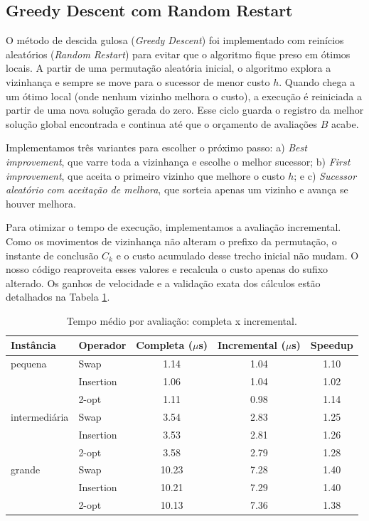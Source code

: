 \subsection{Greedy Descent com Random Restart}
\label{subsec:busca-local}

O método de descida gulosa (\textit{Greedy Descent}) foi implementado com reinícios aleatórios (\textit{Random Restart}) para evitar que o algoritmo fique preso em ótimos locais. A partir de uma permutação aleatória inicial, o algoritmo explora a vizinhança e sempre se move para o sucessor de menor custo $h$. Quando chega a um ótimo local (onde nenhum vizinho melhora o custo), a execução é reiniciada a partir de uma nova solução gerada do zero. Esse ciclo guarda o registro da melhor solução global encontrada e continua até que o orçamento de avaliações $B$ acabe.

Implementamos três variantes para escolher o próximo passo: a) \textit{Best improvement}, que varre toda a vizinhança e escolhe o melhor sucessor; b) \textit{First improvement}, que aceita o primeiro vizinho que melhore o custo $h$; e c) \textit{Sucessor aleatório com aceitação de melhora}, que sorteia apenas um vizinho e avança se houver melhora.

Para otimizar o tempo de execução, implementamos a avaliação incremental. Como os movimentos de vizinhança não alteram o prefixo da permutação, o instante de conclusão $C_k$ e o custo acumulado desse trecho inicial não mudam. O nosso código reaproveita esses valores e recalcula o custo apenas do sufixo alterado. Os ganhos de velocidade e a validação exata dos cálculos estão detalhados na Tabela \ref{tab:incremental}.

\begin{table}[H]
\centering
\caption{Tempo médio por avaliação: completa x incremental.}
\label{tab:incremental}
\begin{tabular}{llccc}
\toprule
Instância & Operador & Completa ($\mu$s) & Incremental ($\mu$s) & Speedup \\
\midrule
pequena & Swap & 1.14 & 1.04 & 1.10 \\
 & Insertion & 1.06 & 1.04 & 1.02 \\
 & 2-opt & 1.11 & 0.98 & 1.14 \\
\midrule
intermedi\'aria & Swap & 3.54 & 2.83 & 1.25 \\
 & Insertion & 3.53 & 2.81 & 1.26 \\
 & 2-opt & 3.58 & 2.79 & 1.28 \\
\midrule
grande & Swap & 10.23 & 7.28 & 1.40 \\
 & Insertion & 10.21 & 7.29 & 1.40 \\
 & 2-opt & 10.13 & 7.36 & 1.38 \\
\bottomrule
\end{tabular}
\end{table}

